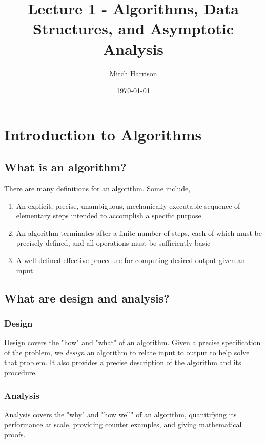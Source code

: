 \documentclass[titlepage, 12pt, leqno]{article}
\title{\Huge{Lecture 1 - Algorithms, Data Structures, and Asymptotic Analysis}}
\author{\large{Mitch Harrison}}
\date{\today}
\begin{document}
\setlength{\parskip}{1\baselineskip}
\setlength{\parindent}{15pt}
\maketitle
\tableofcontents
\newpage


\section{Introduction to Algorithms}

\subsection{What is an algorithm?}
There are many definitions for an algorithm. Some include,
\begin{enumerate}
    \item An explicit, precise, unambiguous, mechanically-executable sequence of
        elementary steps intended to accomplish a specific purpose
    \item An algorithm terminates after a finite number of steps, each of which
        must be precisely defined, and all operations must be sufficiently 
        basic
    \item A well-defined effective procedure for computing desired output given
        an input
\end{enumerate}

\subsection{What are design and analysis?}
\subsubsection{Design}
Design covers the "how" and "what" of an algorithm. Given a precise specification
of the problem, we \textit{design} an algorithm to relate input to output to 
help solve that problem. It also provides a precise description of the
algorithm and its procedure.

\subsubsection{Analysis}
Analysis covers the "why" and "how well" of an algorithm, quanitifying its
performance at scale, providing counter examples, and giving mathematical
proofs.
\end{document}
